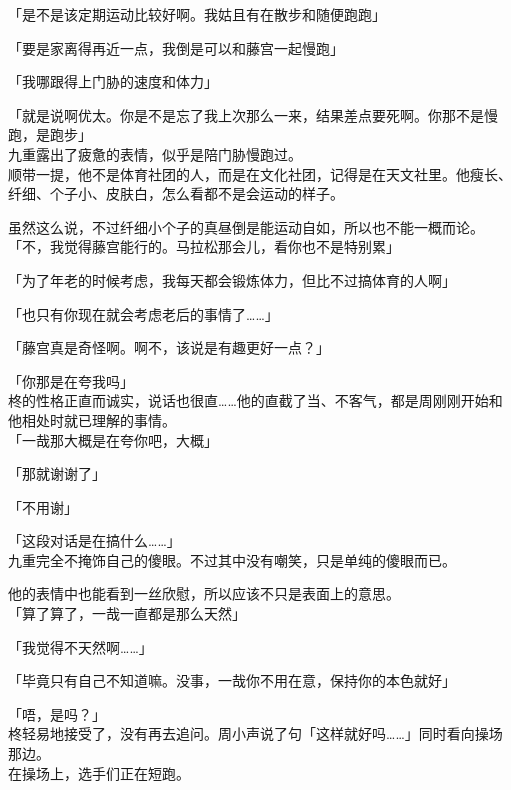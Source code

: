 「是不是该定期运动比较好啊。我姑且有在散步和随便跑跑」

「要是家离得再近一点，我倒是可以和藤宫一起慢跑」

「我哪跟得上门胁的速度和体力」

「就是说啊优太。你是不是忘了我上次那么一来，结果差点要死啊。你那不是慢跑，是跑步」\\

九重露出了疲惫的表情，似乎是陪门胁慢跑过。\\

顺带一提，他不是体育社团的人，而是在文化社团，记得是在天文社里。他瘦长、纤细、个子小、皮肤白，怎么看都不是会运动的样子。

虽然这么说，不过纤细小个子的真昼倒是能运动自如，所以也不能一概而论。\\

「不，我觉得藤宫能行的。马拉松那会儿，看你也不是特别累」

「为了年老的时候考虑，我每天都会锻炼体力，但比不过搞体育的人啊」

「也只有你现在就会考虑老后的事情了……」

「藤宫真是奇怪啊。啊不，该说是有趣更好一点？」

「你那是在夸我吗」\\

柊的性格正直而诚实，说话也很直……他的直截了当、不客气，都是周刚刚开始和他相处时就已理解的事情。\\

「一哉那大概是在夸你吧，大概」

「那就谢谢了」

「不用谢」

「这段对话是在搞什么……」\\

九重完全不掩饰自己的傻眼。不过其中没有嘲笑，只是单纯的傻眼而已。

他的表情中也能看到一丝欣慰，所以应该不只是表面上的意思。\\

「算了算了，一哉一直都是那么天然」

「我觉得不天然啊……」

「毕竟只有自己不知道嘛。没事，一哉你不用在意，保持你的本色就好」

「唔，是吗？」\\

柊轻易地接受了，没有再去追问。周小声说了句「这样就好吗……」同时看向操场那边。\\

在操场上，选手们正在短跑。\\

